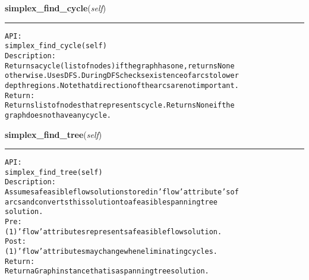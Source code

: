     \label{coinor:gimpy:graph:Graph:simplex_find_cycle}

    \vspace{0.5ex}

\hspace{.8\funcindent}\begin{boxedminipage}{\funcwidth}

    \raggedright \textbf{simplex\_find\_cycle}(\textit{self})

    \vspace{-1.5ex}

    \rule{\textwidth}{0.5\fboxrule}
\setlength{\parskip}{2ex}
\begin{alltt}

API:
    simplex\_find\_cycle(self)
Description:
    Returns a cycle (list of nodes) if the graph has one, returns None
    otherwise. Uses DFS. During DFS checks existence of arcs to lower
    depth regions. Note that direction of the arcs are not important.
Return:
    Returns list of nodes that represents cycle. Returns None if the
    graph does not have any cycle.
\end{alltt}

\setlength{\parskip}{1ex}
    \end{boxedminipage}

    \label{coinor:gimpy:graph:Graph:simplex_find_tree}

    \vspace{0.5ex}

\hspace{.8\funcindent}\begin{boxedminipage}{\funcwidth}

    \raggedright \textbf{simplex\_find\_tree}(\textit{self})

    \vspace{-1.5ex}

    \rule{\textwidth}{0.5\fboxrule}
\setlength{\parskip}{2ex}
\begin{alltt}

API:
    simplex\_find\_tree(self)
Description:
    Assumes a feasible flow solution stored in 'flow' attribute's of
    arcs and converts this solution to a feasible spanning tree
    solution.
Pre:
    (1) 'flow' attributes represents a feasible flow solution.
Post:
    (1) 'flow' attributes may change when eliminating cycles.
Return:
    Return a Graph instance that is a spanning tree solution.
\end{alltt}

\setlength{\parskip}{1ex}
    \end{boxedminipage}


